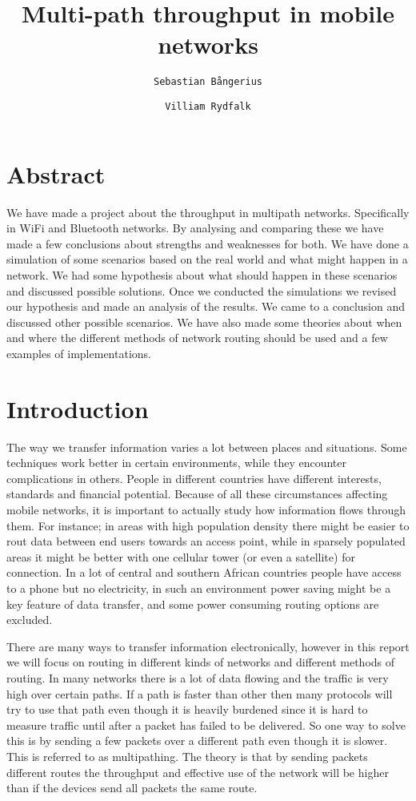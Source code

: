 \documentclass[11pt,twocolumn]{article}
\author{
  \texttt{Sebastian Bångerius}
  \and
  \texttt{Villiam Rydfalk}
}
\begin{document}

\title{Multi-path throughput in mobile networks}
\maketitle

\cleardoublepage


\section{Abstract}

We have made a project about the throughput in multipath networks. Specifically in WiFi and Bluetooth networks. By analysing and comparing these we have made a few conclusions about strengths and weaknesses for both. We have done a simulation of some scenarios based on the real world and what might happen in a network. We had some hypothesis about what should happen in these scenarios and discussed possible solutions. Once we conducted the simulations we revised our hypothesis and made an analysis of the results. We came to a conclusion and discussed other possible scenarios. We have also made some theories about when and where the different methods of network routing should be used and a few examples of implementations.

\section{Introduction}

The way we transfer information varies a lot between places and situations. Some techniques work better in certain environments, while they encounter complications in others. People in different countries have different interests, standards and financial potential. Because of all these circumstances affecting mobile networks, it is important to actually study how information flows through them. For instance; in areas with high population density there might be easier to rout data between end users towards an access point, while in sparsely populated areas it might be better with one cellular tower (or even a satellite) for connection. In a lot of central and southern African countries people have access to a phone but no electricity, in such an environment power saving might be a key feature of data transfer, and some power consuming routing options are excluded.

There are many ways to transfer information electronically, however in this report we will focus on routing in different kinds of networks and different methods of routing. In many networks there is a lot of data flowing and the traffic is very high over certain paths. If a path is faster than other then many protocols will try to use that path even though it is heavily burdened since it is hard to measure traffic until after a packet has failed to be delivered. So one way to solve this is by sending a few packets over a different path even though it is slower. This is referred to as multipathing. The theory is that by sending packets different routes the throughput and effective use of the network will be higher than if the devices send all packets the same route. 
\end{document}
